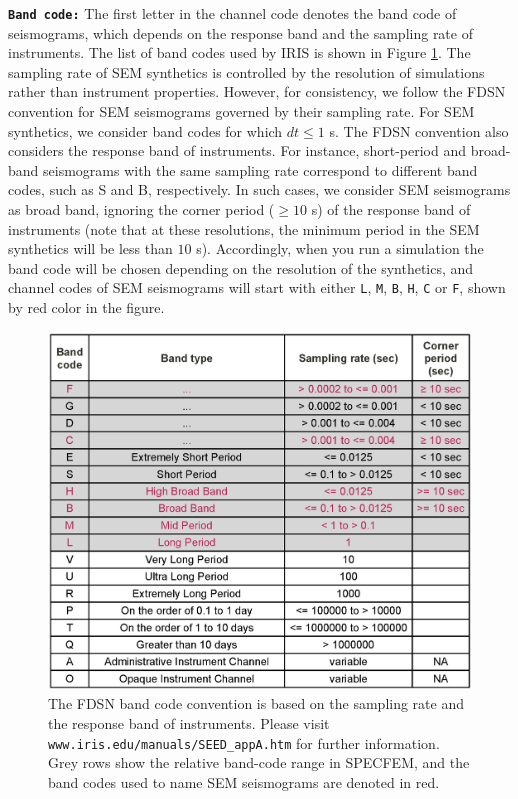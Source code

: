 \documentclass[oneside,english]{book}
\begin{document}
\noindent \textbf{\texttt{Band code:}} The first letter in the channel code denotes the band code of seismograms, which depends on the response band and the sampling rate of instruments. The list of band codes used by IRIS is shown in Figure \ref{fig:IRIS_band_codes}. The sampling rate of SEM synthetics is controlled by the resolution of simulations rather than instrument properties. However, for consistency, we follow the FDSN convention for SEM seismograms governed by their sampling rate. For SEM synthetics, we consider band codes for which $dt \leq 1$ s. The FDSN convention also considers the response band of instruments. For instance, short-period and broad-band seismograms with the same sampling rate correspond to different band codes, such as S and B, respectively. In such cases, we consider SEM seismograms as broad band, ignoring the corner period ($\geq 10$ s) of the response band of instruments (note that at these resolutions, the minimum period in the SEM synthetics will be less than $10$ s). Accordingly, when you run a simulation the band code will be chosen depending on the resolution of the synthetics, and channel codes of SEM seismograms will start with either \texttt{L}, \texttt{M}, \texttt{B}, \texttt{H}, \texttt{C} or \texttt{F}, shown by red color in the figure.\\

\begin{figure}[ht]
\noindent \begin{centering}
\includegraphics[scale=0.6]{figures/IRIS_band_codes.eps}\caption{\label{fig:IRIS_band_codes} The FDSN band code convention is based on the sampling rate and the response band of instruments. Please visit \texttt{www.iris.edu/manuals/SEED\_appA.htm} for further information. Grey rows show the relative band-code range in SPECFEM, and the band codes used to name SEM seismograms are denoted in red.}
\par\end{centering}
\end{figure}
\end{document}
